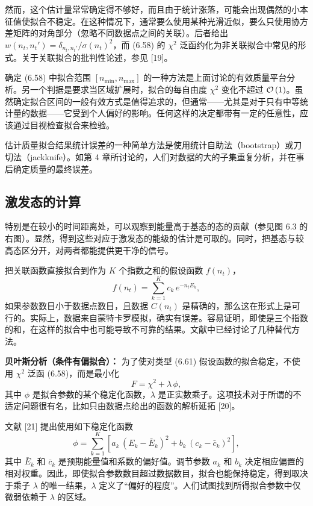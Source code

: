 然而，这个估计量常常确定得不够好，而且由于统计涨落，可能会出现偶然的小本征值使拟合不稳定。在这种情况下，通常要么使用某种光滑近似，要么只使用协方差矩阵的对角部分（忽略不同数据点之间的关联）。后者给出 $w(n_t, n_t') = \delta_{n_t,n_t'}/\sigma(n_t)^2$，而 (6.58) 的 $\chi^2$ 泛函约化为非关联拟合中常见的形式。关于关联拟合的批判性论述，参见 [19]。

确定 (6.58) 中拟合范围 $[n_{\min}, n_{\max}]$ 的一种方法是上面讨论的有效质量平台分析。另一个判据是要求当区域扩展时，拟合的每自由度 $\chi^2$ 变化不超过 $\mathcal{O}\left(1\right)$。虽然确定拟合区间的一般有效方式是值得追求的，但通常——尤其是对于只有中等统计量的数据——它受到个人偏好的影响。任何这样的决定都带有一定的任意性，应该通过目视检查拟合来检验。

估计质量拟合结果统计误差的一种简单方法是使用统计自助法（bootstrap）或刀切法（jackknife）。如第 4 章所讨论的，人们对数据的大的子集重复分析，并在事后确定质量的最终误差。

\subsection{激发态的计算}

特别是在较小的时间距离处，可以观察到能量高于基态的态的贡献（参见图 6.3 的右图）。显然，得到这些对应于激发态的能级的估计是可取的。同时，把基态与较高态区分开，对两者都能提供更干净的信号。

把关联函数直接拟合到作为 $K$ 个指数之和的假设函数 $f(n_t)$，
\begin{equation}
  f(n_t) = \sum_{k=1}^{K} c_k\, e^{-n_t E_k} ,
\end{equation}
如果参数数目小于数据点数目，且数据 $C(n_t)$ 是精确的，那么这在形式上是可行的。实际上，数据来自蒙特卡罗模拟，确实有误差。容易证明，即使是三个指数的和，在这样的拟合中也可能导致不可靠的结果。文献中已经讨论了几种替代方法。

\textbf{贝叶斯分析（条件有偏拟合）：} 为了使对类型 (6.61) 假设函数的拟合稳定，不使用 $\chi^2$ 泛函 (6.58)，而是最小化
\begin{equation}
  F = \chi^2 + \lambda\, \phi ,
\end{equation}
其中 $\phi$ 是拟合参数的某个稳定化函数，$\lambda$ 是正实数乘子。这项技术对于所谓的不适定问题很有名，比如只由数据点给出的函数的解析延拓 [20]。

文献 [21] 提出使用如下稳定化函数
\begin{equation}
  \phi = \sum_{k=1}^{K}\left[ a_k\, (E_k - \bar{E}_k)^2
    + b_k\, (c_k - \bar{c}_k)^2 \right],
\end{equation}
其中 $\bar{E}_k$ 和 $\bar{c}_k$ 是预期能量值和系数的偏好值。调节参数 $a_k$ 和 $b_k$ 决定相应偏置的相对权重。因此，即使拟合参数数目超过数据数目，拟合也能保持稳定，得到取决于乘子 $\lambda$ 的唯一结果，$\lambda$ 定义了“偏好的程度”。人们试图找到所得拟合参数中仅微弱依赖于 $\lambda$ 的区域。

